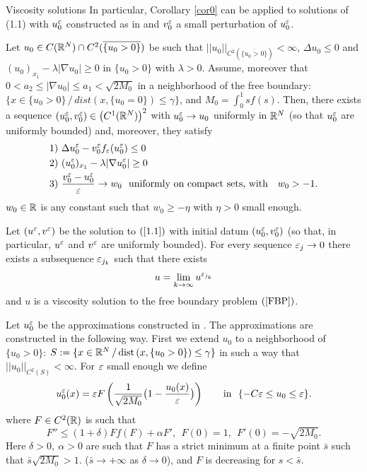 \begin{section}{Viscosity solutions}
In particular, Corollary \ref{cor0} can be applied to solutions of (1.1) with
$u_0^\varepsilon$
constructed as in \cite{CV} and $v_0^\varepsilon$ a small perturbation of $u_0^\varepsilon$.


\begin{cor}
\label{cor4}
Let $u_0\in C({\Bbb R}^N)\cap C^2(\overline{\{u_0>0\}})$ be such that
 $||u_0||_{C^2(\overline{\{u_0>0\}})}<\infty$, $ \Delta u_0\le0$ and
$(u_0)_{x_1}-\lambda|\nabla u_0|\ge 0$ in $\{u_0>0\}$ with $\lambda>0$.
Assume, moreover that   $0<a_2\le |\nabla u_0|\le a_1<\sqrt{2M_0}$ in
a neighborhood of the free boundary: $\{x\in \{u_0>0\}\,/\, dist(x,
\{u_0=0\})\le \gamma\}$, and $M_0=\int_0^1sf(s)$. Then, there exists a 
sequence $(u_0^\varepsilon,v_0^\varepsilon)\in \big(C^1({\Bbb R}^N)\big)^2$
with $u_0^\varepsilon\to u_0$ uniformly in ${\Bbb R}^N$ (so that $u_0^\varepsilon$ are uniformly
bounded) and, moreover, they satisfy
\begin{equation}
\label{u0ep}
\begin{aligned}
&1)\ \Delta u_0^\varepsilon-v_0^\varepsilon f_\varepsilon(u_0^\varepsilon)\le0\\
&2)\ (u_0^\varepsilon)_{x_1}-\lambda|\nabla u_0^\varepsilon|\ge 0\\
&3)\ \frac{v_0^\varepsilon-u_0^\varepsilon}{\varepsilon}\to w_0\ \ \mbox{uniformly on compact sets, with
}\ \ w_0>-1.
\end{aligned}
\end{equation} 
 $w_0\in {\Bbb R}$ is any constant  such that $w_0\ge-\eta$ with $\eta>0$ small
enough.


Let $(u^\varepsilon,v^\varepsilon)$ be the solution to $(\ref{1.1})$ with initial datum 
$(u_0^\varepsilon,v_0^\varepsilon)$ (so that, in particular, $u^\varepsilon$ and $v^\varepsilon$ are
uniformly bounded).  For every sequence ${\varepsilon_j}\to 0$ there exists
a subsequence ${\varepsilon_{j_k}}$ such that there exists
$$
u=\lim_{k\to\infty}u^{\varepsilon_{j_k}}
$$
and $u$ is a viscosity solution to the free boundary problem $(\ref{FBP})$.

\end{cor}

\begin{pf}  Let $u_0^\varepsilon$ be the approximations constructed in \cite{CV}.
The approximations are constructed in the following way. First we extend
$u_0$ to a neighborhood of $\{u_0>0\}$: $S:=\{x\in {\Bbb R}^N\,/\,\mbox{dist}\,(x,
\{u_0>0\})\le\gamma\}$ in such a way that $||u_0||_{C^2(S)}<\infty$. 
For $\varepsilon$ small enough we define
$$
u_0^\varepsilon(x)=\varepsilon F\left(\frac1{\sqrt{2M_0}}\big(1-\frac{u_0(x)}{\varepsilon}\big)\right)
\qquad\mbox{in }\ \{-C\varepsilon\le u_0\le \varepsilon\}.
$$
where $F\in C^2({\Bbb R})$ is such that
$$
F''\le (1+\delta)F f(F)+\alpha F',\ \ F(0)=1,\ \ F'(0)=-\sqrt{2M_0}.
$$
Here $\delta>0,\ \alpha>0$ are such that $F$ has a strict minimum at
a finite point $\bar s$ such that $\bar s\sqrt{2M_0}>1$. ($\bar s\to+
\infty$ as $\delta\to 0$), and $F$ is decreasing for $s<\bar s$. 


\end{pf}
\end{section}
